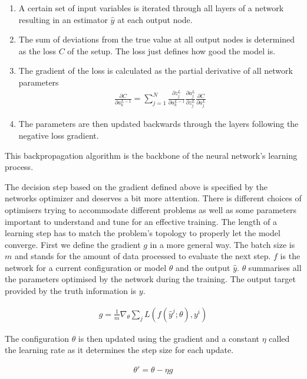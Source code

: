 \begin{enumerate}
    \item A certain set of input variables is iterated through all layers of a network resulting in an estimator $\hat{y}$ at each output node.
    \item The sum of deviations from the true value at all output nodes is determined as the loss $C$ of the setup. The loss just defines how good the model is.
    \item The gradient of the loss is calculated as the partial derivative of all network parameters
    \begin{align*}
        \frac{\partial C}{\partial a_k^{L-1}} = \sum_{j=1}^N \frac{\partial z_j^L}{\partial a_k^{L-1}} \frac{\partial a_j^L}{\partial z_j^L}\frac{\partial C}{\partial a_j^L}
    \end{align*}
    \item The parameters are then updated backwards through the layers following the negative loss gradient.
\end{enumerate}

This backpropagation algorithm is the backbone of the neural network's learning process.

The decision step based on the gradient defined above is specified by the networks optimizer and deserves a bit more attention. There is different choices of optimisers trying to accommodate different problems as well as some parameters important to understand and tune for an effective training. The length of a learning step has to match the problem's topology to properly let the model converge. First we define the gradient $g$ in a more general way. The batch size is $m$ and stands for the amount of data processed to evaluate the next step. $f$ is the network for a current configuration or model $\theta$ and the output $\hat{y}$. $\theta$ summarises all the parameters optimised by the network during the training. The output target provided by the truth information is $y$.

\begin{align}
    g = \frac{1}{m} \nabla_{\theta} \sum_j L(f(\hat{y}^j; \theta), y^i)
\end{align}

The configuration $\theta$ is then updated using the gradient and a constant $\eta$ called the learning rate as it determines the step size for each update.

\begin{align}
    \theta \prime = \theta - \eta g
\end{align}


